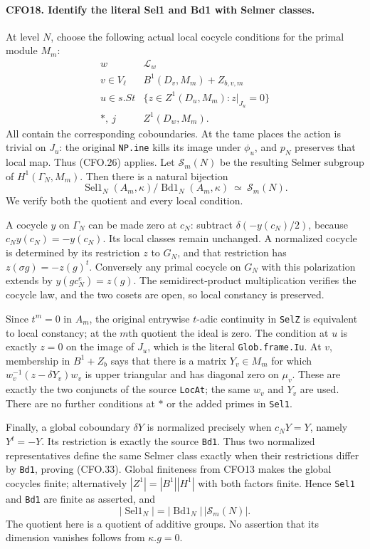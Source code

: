 \paragraph{CFO18. Identify the literal Sel1 and Bd1 with Selmer classes.}
\label{claim:CFO18}
At level $N$, choose the following actual local cocycle
conditions for the primal module $M_m$:
\[
 \begin{array}{c|l}
 w&\mathcal L_w\\ \hline
 v\in V_\ell&B^1(D_v,M_m)+Z_{b,v,m}\\
 u\in s.St&\{z\in Z^1(D_u,M_m):z|_{J_u}=0\}\\
 \ast,\ j&Z^1(D_w,M_m).
 \end{array}                                                     \tag{CFO.32}
\]
All contain the corresponding coboundaries.  At the
tame places the action is trivial on $J_u$: the original
\texttt{NP.ine} kills its image under $\phi_u$, and
$p_N$ preserves that local map.  Thus (CFO.26) applies.
Let $\mathscr S_m(N)$ be the resulting Selmer subgroup
of $H^1(\Gamma_N,M_m)$.
Then there is a natural bijection
\[
 \operatorname{Sel1}_N(A_m,\kappa)/
       \operatorname{Bd1}_N(A_m,\kappa)
                       \ \simeq\ \mathscr S_m(N).               \tag{CFO.33}
\]
We verify both the quotient and every local condition.

A cocycle $y$ on $\Gamma_N$ can be made zero at $c_N$:
subtract $\delta(-y(c_N)/2)$, because
$c_Ny(c_N)=-y(c_N)$.  Its local classes remain unchanged.
A normalized cocycle is determined by its restriction
$z$ to $G_N$, and that restriction has
$z(\sigma g)=-z(g)^t$.
Conversely any primal cocycle on $G_N$ with this
polarization extends by $y(gc_N^e)=z(g)$.
The semidirect-product multiplication verifies the
cocycle law, and the two cosets are open, so local
constancy is preserved.

Since $t^m=0$ in $A_m$, the original entrywise
$t$-adic continuity in \texttt{SelZ} is equivalent to
local constancy; at the $m$th quotient the ideal is zero.
The condition at $u$ is exactly $z=0$ on the image of
$J_u$, which is the literal \texttt{Glob.frame.Iu}.
At $v$, membership in $B^1+Z_b$ says that there is a
matrix $Y_v\in M_m$ for which
$w_v^{-1}(z-\delta Y_v)w_v$ is upper triangular and
has diagonal zero on $\mu_v$.  These are exactly the
two conjuncts of the source \texttt{LocAt}; the same
$w_v$ and $Y_v$ are used.  There are no further
conditions at $\ast$ or the added primes in \texttt{Sel1}.

Finally, a global coboundary $\delta Y$ is normalized
precisely when $c_NY=Y$, namely $Y^t=-Y$.
Its restriction is exactly the source \texttt{Bd1}.
Thus two normalized representatives define the same
Selmer class exactly when their restrictions differ
by \texttt{Bd1}, proving (CFO.33).
Global finiteness from CFO13 makes the global cocycles
finite; alternatively $|Z^1|=|B^1||H^1|$ with both
factors finite.  Hence \texttt{Sel1} and \texttt{Bd1}
are finite as asserted, and
\[
 |\operatorname{Sel1}_N|
     =|\operatorname{Bd1}_N|\,|\mathscr S_m(N)|.                 \tag{CFO.34}
\]
The quotient here is a quotient of additive groups.
No assertion that its dimension vanishes follows from
$\kappa.g=0$.

